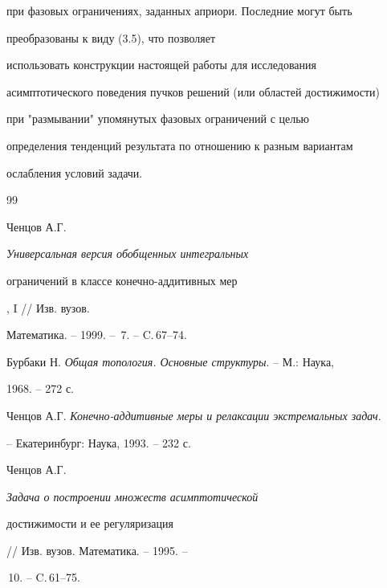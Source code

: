 при фазовых ограничениях, заданных априори. Последние могут быть


преобразованы к виду (3.5), что позволяет


использовать конструкции настоящей работы для исследования


асимптотического поведения пучков решений (или областей достижимости)


при "размывании" упомянутых фазовых ограничений с целью


определения тенденций результата по отношению к разным вариантам


ослабления условий задачи.





\begin{thebibliography}{99}







Ченцов А.Г. {\em Универсальная версия обобщенных интегральных


ограничений в классе конечно-аддитивных мер}, I // Изв. вузов.


Математика. -- 1999. -- \No\,7. -- C.\,67--74.




Бурбаки Н. {\em Общая топология. Основные структуры}. -- М.: Наука,


1968. -- 272 с.




Ченцов А.Г. {\em Конечно-аддитивные меры и релаксации экстремальных задач}.


-- Екатеринбург: Наука, 1993. -- 232 с.




Ченцов А.Г. {\em Задача о построении множеств асимптотической


достижимости и ее регуляризация} // Изв. вузов. Математика. -- 1995. --


\No\,10. -- C.\,61--75.





\end{thebibliography}





\vskip 2cm














\label{end}












